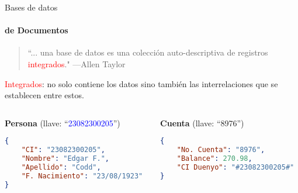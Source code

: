 \begin{frame}[fragile]{Bases de datos}
    \framesubtitle{de Documentos}

    \begin{overlayarea}{\linewidth}{\textheight}
        \begin{onlyenv}
            \begin{block}{}
                \begin{quote}
                    ``... una base de datos es una colecci\'on auto-descriptiva de registros \textcolor{red}{integrados}."
                    \hspace{1em plus 1fill}---Allen Taylor
                \end{quote}
                \textcolor{red}{Integrados}: no solo contiene los datos sino tambi\'en las interrelaciones
                 que se establecen entre estos.
            \end{block}
      \end{onlyenv}

      \vspace{3mm}
        \begin{columns}
            \begin{column}[t]{0.525\textwidth}
                \centering
                \large \textbf{Persona} (llave:  ``\textcolor{blue}{23082300205}'')

        \begin{lstlisting}[language=json]
{  
    "CI": "23082300205", 
    "Nombre": "Edgar F.", 
    "Apellido": "Codd", 
    "F. Nacimiento": "23/08/1923"
}
        \end{lstlisting}
            \end{column}

            \begin{column}[t]{0.475\textwidth}
                \centering
                \large \textbf{Cuenta} (llave: ``8976'')

        \begin{lstlisting}[language=json]
{  
    "No. Cuenta": "8976", 
    "Balance": 270.98, 
    "CI Duenyo": "#23082300205#"
}
                \end{lstlisting} 
            \end{column}
        \end{columns}
    \end{overlayarea}
    
\end{frame}
